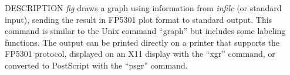% 
% 
% 
% 
%                                                                        
%

\begin{synopsis}
 \item[fig] [ --F $F$ ] [ --R $R$ ] [ --W $W$ ] [ --H $H$] [ --o $xo$ $yo$ ]
            [ --g $G$ ]  [ --p $P$ ] 
 \item[\ ~~~] [ --s $S$ ] [ --f $file$ ] [ --t ] [ {\em infile} ]
\end{synopsis}

\begin{qsection}{DESCRIPTION}
{\em fig} draws a graph using information 
from {\em infile} (or standard input), 
sending the result in FP5301 plot format to standard output. 
This command is similar to the Unix command ``graph'' 
but includes some labeling functions. 
The output can be printed directly on a printer 
that supports the FP5301 protocol, 
displayed on an X11 display with the ``xgr'' command, 
or converted to PostScript with the ``psgr'' command.
\end{qsection}

